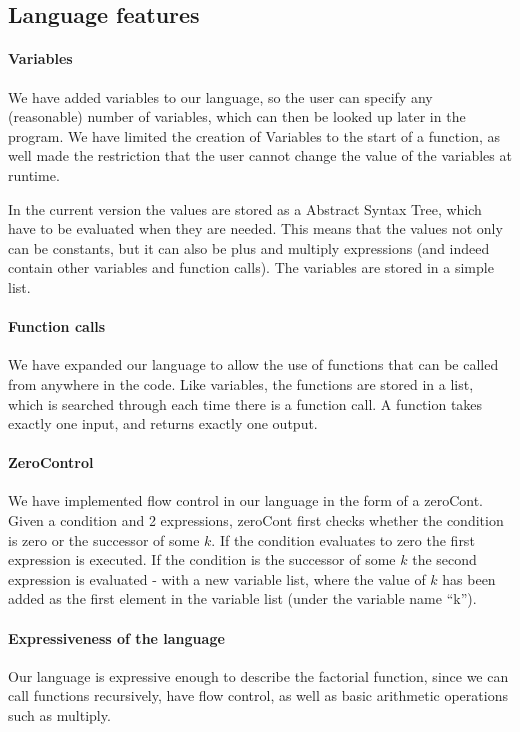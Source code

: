 \subsection{Language features}

\paragraph{Variables}
We have added variables to our language, so the user can specify any
(reasonable) number of variables, which can then be looked up later in
the program. We have limited the creation of Variables to the start of
a function, as well made the restriction that the user cannot change
the value of the variables at runtime.

In the current version the values are stored as a Abstract Syntax
Tree, which have to be evaluated when they are needed. This means that
the values not only can be constants, but it can also be plus and
multiply expressions (and indeed contain other variables and function
calls). The variables are stored in a simple list.

\paragraph{Function calls}
We have expanded our language to allow the use of functions that can
be called from anywhere in the code. Like variables, the functions are
stored in a list, which is searched through each time there is a
function call. A function takes exactly one input, and returns exactly
one output.

\paragraph{ZeroControl}
We have implemented flow control in our language in the form of a
zeroCont. Given a condition and 2 expressions, zeroCont first checks
whether the condition is zero or the successor of some $k$. If the
condition evaluates to zero the first expression is executed. If the
condition is the successor of some $k$ the second expression is
evaluated - with a new variable list, where the value of $k$ has been
added as the first element in the variable list (under the variable
name ``k'').

\paragraph{Expressiveness of the language}
Our language is expressive enough to describe the factorial function,
since we can call functions recursively, have flow control, as well as
basic arithmetic operations such as multiply.

